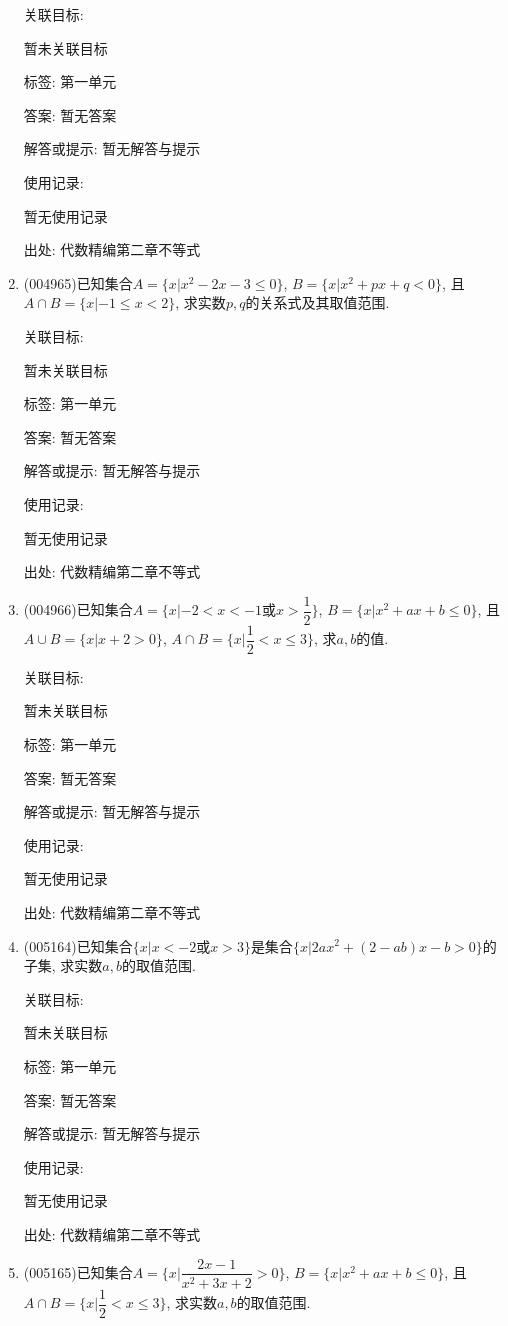 \documentclass[10pt,a4paper]{article}
\begin{document}
\begin{enumerate}[1.]
关联目标:

暂未关联目标



标签: 第一单元

答案: 暂无答案

解答或提示: 暂无解答与提示

使用记录:

暂无使用记录


出处: 代数精编第二章不等式
\item { (004965)}已知集合$A=\{x|x^2-2x-3\le 0\}$, $B=\{x|x^2+px+q<0\}$, 且$A\cap B=\{x|-1\le x<2\}$, 求实数$p,q$的关系式及其取值范围.


关联目标:

暂未关联目标



标签: 第一单元

答案: 暂无答案

解答或提示: 暂无解答与提示

使用记录:

暂无使用记录


出处: 代数精编第二章不等式
\item { (004966)}已知集合$A=\{x|-2<x<-1\text{或}x>\dfrac 12\}$, $B=\{x|x^2+ax+b\le 0\}$, 且$A\cup B=\{x|x+2>0\}$, $A\cap B=\{x|\dfrac 12<x\le 3\}$, 求$a,b$的值.


关联目标:

暂未关联目标



标签: 第一单元

答案: 暂无答案

解答或提示: 暂无解答与提示

使用记录:

暂无使用记录


出处: 代数精编第二章不等式
\item { (005164)}已知集合$\{x|x<-2\text{或}x>3\}$是集合$\{x|2ax^2+(2-ab)x-b>0\}$的子集, 求实数$a,b$的取值范围.


关联目标:

暂未关联目标



标签: 第一单元

答案: 暂无答案

解答或提示: 暂无解答与提示

使用记录:

暂无使用记录


出处: 代数精编第二章不等式
\item { (005165)}已知集合$A=\{x|\dfrac{2x-1}{x^2+3x+2}>0\}$, $B=\{x|x^2+ax+b\le 0\}$, 且$A\cap B=\{x|\dfrac 12<x\le 3\}$, 求实数$a,b$的取值范围.



\end{enumerate}
\end{document}
